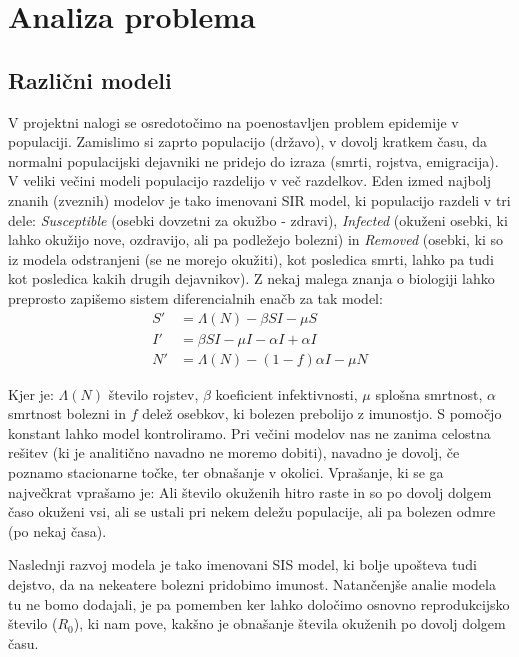 \documentclass[a4paper, 11pt]{article}
\begin{document}
\section*{Analiza problema}
\subsection*{Različni modeli}
V projektni nalogi se osredotočimo na poenostavljen problem epidemije v populaciji. Zamislimo si zaprto populacijo (državo), v dovolj kratkem času, da normalni populacijski dejavniki ne pridejo do izraza (smrti, rojstva, emigracija). V veliki večini modeli populacijo razdelijo v več razdelkov. Eden izmed najbolj znanih (zveznih) modelov je tako imenovani SIR model, ki populacijo razdeli v tri dele: \emph{Susceptible} (osebki dovzetni za okužbo - zdravi), \emph{Infected} (okuženi osebki, ki lahko okužijo nove, ozdravijo, ali pa podležejo bolezni) in \emph{Removed} (osebki, ki so iz modela odstranjeni (se ne morejo okužiti), kot posledica smrti, lahko pa tudi kot posledica kakih drugih dejavnikov). Z nekaj malega znanja o biologiji lahko preprosto zapišemo sistem diferencialnih enačb za tak model:
\begin{align*}
	S' &= \Lambda(N) - \beta S I - \mu S \\
	I' &= \beta S I - \mu I -\alpha I  + \alpha I \\
	N' &= \Lambda(N) - (1-f)\alpha I - \mu N 
\end{align*}

Kjer je: $\Lambda(N)$ število rojstev, $\beta$ koeficient infektivnosti, $\mu$ splošna smrtnost, $\alpha$ smrtnost bolezni in $f$ delež osebkov, ki bolezen prebolijo z imunostjo. S pomočjo konstant lahko model kontroliramo. Pri večini modelov nas ne zanima celostna rešitev (ki je analitično navadno ne moremo dobiti), navadno je dovolj, če poznamo stacionarne točke, ter obnašanje v okolici. Vprašanje, ki se ga največkrat vprašamo je: Ali število okuženih hitro raste in so po dovolj dolgem časo okuženi vsi, ali se ustali pri nekem deležu populacije, ali pa bolezen odmre (po nekaj časa).

Naslednji razvoj modela je tako imenovani SIS model, ki bolje upošteva tudi dejstvo, da na nekeatere bolezni pridobimo imunost. Natančenjše analie modela tu ne bomo dodajali, je pa pomemben ker lahko določimo osnovno reprodukcijsko število ($R_0$), ki nam pove, kakšno je obnašanje števila okuženih po dovolj dolgem času.
\end{document}
